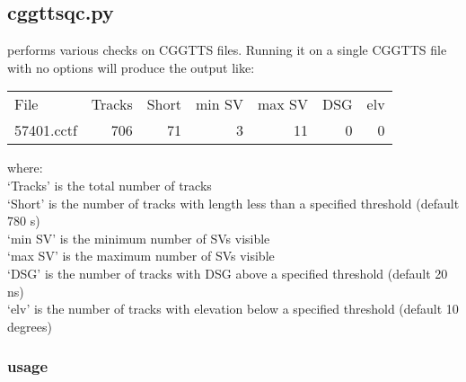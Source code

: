 \subsection{cggttsqc.py}

 performs various checks on CGGTTS files.
Running it on a single CGGTTS file with no options will produce the  output like:

\begin{tabular}{lrrrrrr}
File         & Tracks  & Short & min SV & max SV   &  DSG  &  elv \\
57401.cctf   &   706   &  71   &   3    &  11      & 0     &  0   \\
\end{tabular}

where:\\
`Tracks' is the total number of tracks\\
`Short'  is the number of tracks with length less than a specified threshold (default 780 s)\\
`min SV' is the minimum number of SVs visible\\
`max SV' is the maximum number of SVs visible \\
`DSG'    is the number of tracks with DSG above a specified threshold (default 20 ns)\\
`elv'    is the number of tracks with elevation below a specified threshold (default 10 degrees)\\

\subsubsection{usage}

